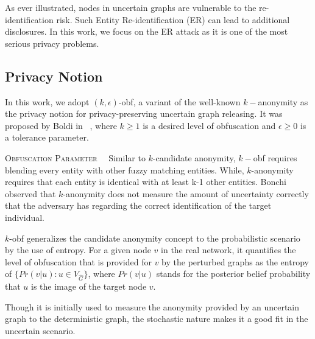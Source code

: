As ever illustrated, nodes in uncertain graphs are vulnerable to the re-identification risk. Such Entity Re-identification (ER) can lead to additional disclosures. In this work, we focus on the ER attack as it is one of the most serious privacy problems. 
\subsection{Privacy Notion}
\label{sec:privacyNotion}
In this work, we adopt $(k,\epsilon)$-obf, a variant of the well-known $k-$anonymity as the privacy notion for privacy-preserving uncertain graph releasing. 
It was proposed by Boldi {\etal} in ~\cite{Boldi_Injecting_2012}, where $k \ge 1$ is a desired level of obfuscation and $\epsilon \ge 0$ is a tolerance parameter. 

\textsc{Obfuscation Parameter}~~
Similar to $k$-candidate anonymity, 
$k-$obf requires blending every entity with other fuzzy matching entities. 
While, $k$-anonymity requires that each entity is identical with at least k-1 other entities. 
Bonchi{\etal}~\cite{Bonchi_Identity_2014} observed that $k$-anonymity does not measure the amount of uncertainty correctly that the adversary has regarding the correct identification of the target individual. 

$k$-obf generalizes the candidate anonymity concept to the probabilistic scenario by the use of entropy. 
For a given node $v$ in the real network, it quantifies the level of obfuscation that is provided for $v$ by the perturbed graphs as the entropy of $\lbrace Pr(v|u) : u \in V_{\hat{G}}  \rbrace$, where $Pr(v|u)$ stands for the posterior belief probability that $u$ is the image of the target node $v$. 

Though it is initially used to measure the anonymity provided by an uncertain graph to the deterministic graph, the stochastic nature makes it a good fit in the uncertain scenario. 

